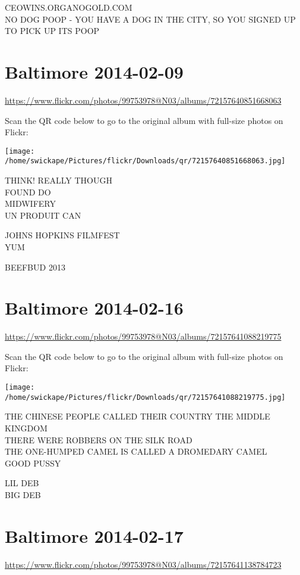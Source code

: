 \documentclass[10pt,letterpaper]{article}
\begin{document}
CEOWINS.ORGANOGOLD.COM\\
NO DOG POOP {-} YOU HAVE A DOG IN THE CITY, SO YOU SIGNED UP TO PICK UP ITS POOP
\pagebreak

\section*{Baltimore 2014-02-09}

\url{https://www.flickr.com/photos/99753978@N03/albums/72157640851668063}

Scan the QR code below to go to the original album with full-size photos on Flickr:

\texttt{[image: /home/swickape/Pictures/flickr/Downloads/qr/72157640851668063.jpg]}
\pagebreak

THINK!  REALLY THOUGH\\
FOUND DO\\
MIDWIFERY\\
UN PRODUIT CAN

JOHNS HOPKINS FILMFEST\\
YUM

BEEFBUD 2013
\pagebreak

\section*{Baltimore 2014-02-16}

\url{https://www.flickr.com/photos/99753978@N03/albums/72157641088219775}

Scan the QR code below to go to the original album with full-size photos on Flickr:

\texttt{[image: /home/swickape/Pictures/flickr/Downloads/qr/72157641088219775.jpg]}
\pagebreak

THE CHINESE PEOPLE CALLED THEIR COUNTRY THE MIDDLE KINGDOM\\
THERE WERE ROBBERS ON THE SILK ROAD\\
THE ONE{-}HUMPED CAMEL IS CALLED A DROMEDARY CAMEL\\
GOOD PUSSY

LIL DEB\\
BIG DEB
\pagebreak

\section*{Baltimore 2014-02-17}

\url{https://www.flickr.com/photos/99753978@N03/albums/72157641138784723}
\end{document}
